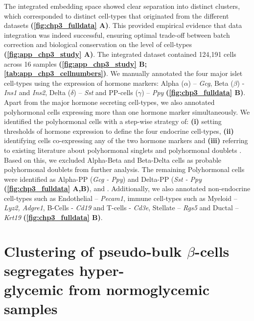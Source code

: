 \par The integrated embedding space showed clear separation into distinct clusters, which corresponded to distinct cell-types that originated from the different datasets \textbf{(\autoref{fig:chp3_fulldata} A)}. This provided empirical evidence that data integration was indeed successful, ensuring optimal trade-off between batch correction and biological conservation on the level of cell-types \textbf{(\autoref{fig:app_chp3_study} A)}. The integrated dataset contained 124,191 cells across 16 samples \textbf{(\autoref{fig:app_chp3_study} B; \autoref{tab:app_chp3_cellnumbers})}. We manually annotated the four major islet cell-types using the expression of hormone markers: Alpha ($\alpha$) – \textit{Gcg}, Beta ($\beta$) - \textit{Ins1} and \textit{Ins2}, Delta ($\delta$) – \textit{Sst} and PP-cells ($\gamma$) – \textit{Ppy} \textbf{(\autoref{fig:chp3_fulldata} B)}. Apart from the major hormone secreting cell-types, we also annotated polyhormonal cells expressing more than one hormone marker simultaneously. We identified the polyhormonal cells with a step-wise strategy of: \textbf{(i)} setting thresholds of hormone expression to define the four endocrine cell-types, \textbf{(ii)} identifying cells co-expressing any of the two hormone markers and \textbf{(iii)} referring to existing literature about polyhormonal singlets and polyhormonal doublets \textbf{\cite{sachs_targeted_2020, perez-frances_pancreatic_2021}}. Based on this, we excluded Alpha-Beta and Beta-Delta cells as probable polyhormonal doublets from further analysis. The remaining Polyhormonal cells were identified as Alpha-PP (\textit{Gcg - Ppy}) and Delta-PP (\textit{Sst - Ppy} \textbf{(\autoref{fig:chp3_fulldata} A,B)}, and . Additionally, we also annotated non-endocrine cell-types such as Endothelial – \textit{Pecam1}, immune cell-types such as Myeloid – \textit{Lyz2, Adgre1}, B-Cells - \textit{Cd19} and T-cells - \textit{Cd3e}, Stellate – \textit{Rgs5} and Ductal – \textit{Krt19} \textbf{(\autoref{fig:chp3_fulldata} B)}.


\section[Clustering of pseudo-bulk $\beta$-cells segregates hyperglycemic from normoglycemic samples]{Clustering of pseudo-bulk $\beta$-cells segregates hyper-\\glycemic from normoglycemic samples}
\label{sec:chp3_pseudobulk}

